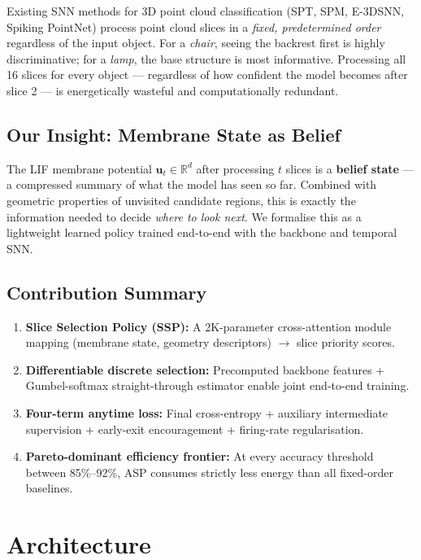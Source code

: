 \documentclass[11pt,a4paper]{article}
\begin{document}
Existing SNN methods for 3D point cloud classification (SPT, SPM, E-3DSNN, Spiking PointNet)
process point cloud slices in a \textit{fixed, predetermined order} regardless of the input object.
For a \textit{chair}, seeing the backrest first is highly discriminative; for a \textit{lamp},
the base structure is most informative. Processing all 16 slices for every object ---
regardless of how confident the model becomes after slice 2 --- is energetically wasteful and
computationally redundant.

\subsection{Our Insight: Membrane State as Belief}

The LIF membrane potential $\mathbf{u}_t \in \mathbb{R}^d$ after processing $t$ slices is a
\textbf{belief state} --- a compressed summary of what the model has seen so far. Combined with
geometric properties of unvisited candidate regions, this is exactly the information needed to
decide \emph{where to look next}. We formalise this as a lightweight learned policy trained
end-to-end with the backbone and temporal SNN.

\subsection{Contribution Summary}

\begin{enumerate}
  \item \textbf{Slice Selection Policy (SSP):} A 2K-parameter cross-attention module
        mapping (membrane state, geometry descriptors) $\to$ slice priority scores.
  \item \textbf{Differentiable discrete selection:} Precomputed backbone features +
        Gumbel-softmax straight-through estimator enable joint end-to-end training.
  \item \textbf{Four-term anytime loss:} Final cross-entropy + auxiliary intermediate
        supervision + early-exit encouragement + firing-rate regularisation.
  \item \textbf{Pareto-dominant efficiency frontier:} At every accuracy threshold
        between 85\%--92\%, ASP consumes strictly less energy than all fixed-order baselines.
\end{enumerate}

\section{Architecture}
\end{document}
